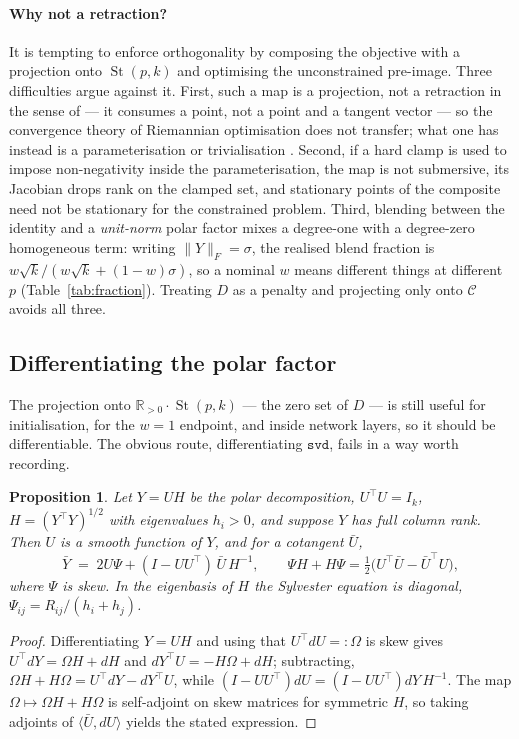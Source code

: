 \documentclass[11pt]{article}
\newtheorem{proposition}{Proposition}
\theoremstyle{definition}
\DeclareMathOperator{\st}{St}
\newcommand{\R}{\mathbb{R}}
\newcommand{\Rpos}{\R_{>0}}
\newcommand{\Fnorm}[1]{\lVert #1 \rVert_F}
\newcommand{\ip}[2]{\langle #1, #2 \rangle}
\begin{document}
\paragraph{Why not a retraction?} It is tempting to enforce orthogonality by
composing the objective with a projection onto $\st(p,k)$ and optimising the
unconstrained pre-image. Three difficulties argue against it. First, such a map
is a projection, not a retraction in the sense of \citet{absil2008} --- it
consumes a point, not a point and a tangent vector --- so the convergence theory
of Riemannian optimisation does not transfer; what one has instead is a
parameterisation or trivialisation \citep{lezcano2019}. Second, if a hard clamp
is used to impose non-negativity inside the parameterisation, the map is not
submersive, its Jacobian drops rank on the clamped set, and stationary points of
the composite need not be stationary for the constrained problem. Third, blending
between the identity and a \emph{unit-norm} polar factor mixes a degree-one with
a degree-zero homogeneous term: writing $\Fnorm{Y}=\sigma$, the realised blend
fraction is $w\sqrt{k}/(w\sqrt{k}+(1-w)\sigma)$, so a nominal $w$ means different
things at different $p$ (Table~\ref{tab:fraction}). Treating $D$ as a penalty and
projecting only onto $\mathcal{C}$ avoids all three.

\subsection{Differentiating the polar factor}

The projection onto $\Rpos\cdot\st(p,k)$ --- the zero set of $D$ --- is still
useful for initialisation, for the $w=1$ endpoint, and inside network layers, so
it should be differentiable. The obvious route, differentiating
$\texttt{svd}$, fails in a way worth recording.

\begin{proposition}\label{prop:polar}
Let $Y = UH$ be the polar decomposition, $U^\top U = I_k$,
$H = (Y^\top Y)^{1/2}$ with eigenvalues $h_i > 0$, and suppose $Y$ has full
column rank. Then $U$ is a smooth function of $Y$, and for a cotangent
$\bar U$,
\begin{equation}
  \bar Y \;=\; 2U\Psi + (I - UU^\top)\,\bar U\,H^{-1},
  \qquad \Psi H + H\Psi = \tfrac12\big(U^\top\bar U - \bar U^\top U\big),
\end{equation}
where $\Psi$ is skew. In the eigenbasis of $H$ the Sylvester equation is diagonal,
$\Psi_{ij} = R_{ij}/(h_i + h_j)$.
\end{proposition}
\begin{proof}
Differentiating $Y = UH$ and using that $U^\top dU =: \Omega$ is skew gives
$U^\top dY = \Omega H + dH$ and $dY^\top U = -H\Omega + dH$; subtracting,
$\Omega H + H\Omega = U^\top dY - dY^\top U$, while
$(I-UU^\top)dU = (I-UU^\top)dY\,H^{-1}$. The map
$\Omega \mapsto \Omega H + H\Omega$ is self-adjoint on skew matrices for
symmetric $H$, so taking adjoints of
$\ip{\bar U}{dU}$ yields the stated expression.
\end{proof}
\end{document}
